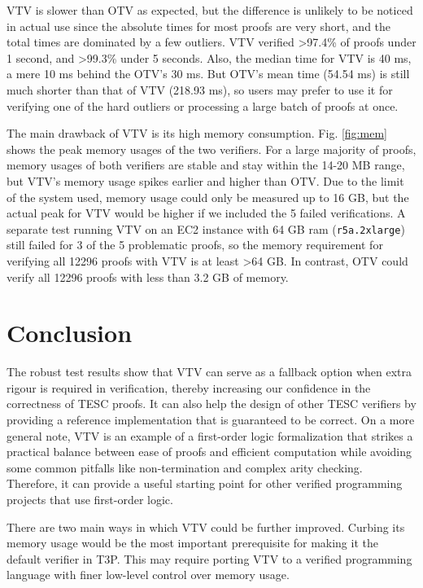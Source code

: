 \documentclass{lipics-v2021}
\begin{document}


VTV is slower than OTV as expected, but the difference is unlikely to be noticed 
in actual use since the absolute times for most proofs are very short, and the 
total times are dominated by a few outliers. 
VTV verified >97.4\% of proofs under 1 second, and >99.3\% under 5 seconds. 
Also, the median time for VTV is 40 ms, a mere 10 ms behind the OTV's 30 ms. 
But OTV's mean time (54.54 ms) is still much shorter than that of VTV (218.93 ms),
so users may prefer to use it for verifying one of the hard outliers or processing
a large batch of proofs at once.

The main drawback of VTV is its high memory consumption. Fig. \ref{fig:mem} shows
the peak memory usages of the two verifiers. For a large majority of proofs, 
memory usages of both verifiers are stable and stay within the 14-20 MB range,
but VTV's memory usage spikes earlier and higher than OTV. Due to the limit of the system 
used, memory usage could only be measured up to 16 GB, but the actual peak for VTV 
would be higher if we included the 5 failed verifications. A separate test running 
VTV on an EC2 instance with 64 GB ram (\texttt{r5a.2xlarge}) still failed for 3 of 
the 5 problematic proofs, so the memory requirement for verifying all 12296 proofs 
with VTV is at least >64 GB. In contrast, OTV could verify all 
12296 proofs with less than 3.2 GB of memory.



\section{Conclusion}  \label{sec:conclusion}

The robust test results show that VTV can serve as a fallback option when extra rigour 
is required in verification, thereby increasing our confidence in the correctness of TESC proofs. 
It can also help the design of other TESC verifiers by providing a reference implementation 
that is guaranteed to be correct. On a more general note, VTV is an example of a first-order logic 
formalization that strikes a practical balance between ease of proofs and efficient computation 
while avoiding some common pitfalls like non-termination and complex arity checking. 
Therefore, it can provide a useful starting point for other verified programming projects 
that use first-order logic.

There are two main ways in which VTV could be further improved. Curbing its 
memory usage would be the most important prerequisite for making it the 
default verifier in T3P. This may require porting VTV to a verified programming
language with finer low-level control over memory usage. 
\end{document}
